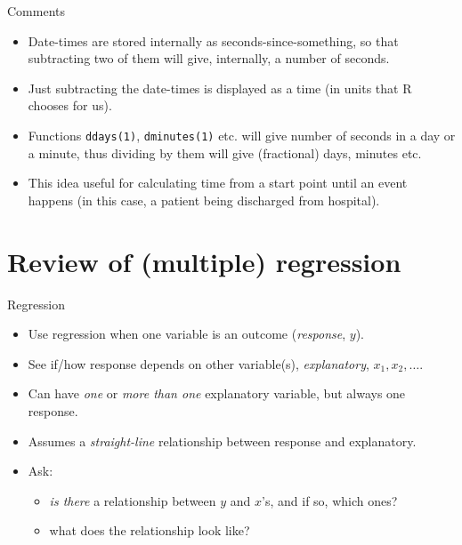 \documentclass[ignorenonframetext,]{beamer}
\providecommand{\tightlist}{%
  \setlength{\itemsep}{0pt}\setlength{\parskip}{0pt}}
\begin{document}
\begin{frame}[fragile]{Comments}
\protect\hypertarget{comments}{}

\begin{itemize}
\tightlist
\item
  Date-times are stored internally as seconds-since-something, so that
  subtracting two of them will give, internally, a number of seconds.
\item
  Just subtracting the date-times is displayed as a time (in units that
  R chooses for us).
\item
  Functions \texttt{ddays(1)}, \texttt{dminutes(1)} etc. will give
  number of seconds in a day or a minute, thus dividing by them will
  give (fractional) days, minutes etc.
\item
  This idea useful for calculating time from a start point until an
  event happens (in this case, a patient being discharged from
  hospital).
\end{itemize}

\end{frame}

\hypertarget{review-of-multiple-regression}{%
\section{Review of (multiple)
regression}\label{review-of-multiple-regression}}

\begin{frame}{Regression}
\protect\hypertarget{regression}{}

\begin{itemize}
\item
  Use regression when one variable is an outcome (\emph{response},
  \(y\)).
\item
  See if/how response depends on other variable(s), \emph{explanatory},
  \(x_1, x_2,\ldots\).
\item
  Can have \emph{one} or \emph{more than one} explanatory variable, but
  always one response.
\item
  Assumes a \emph{straight-line} relationship between response and
  explanatory.
\item
  Ask:

  \begin{itemize}
  \tightlist
  \item
    \emph{is there} a relationship between \(y\) and \(x\)'s, and if so,
    which ones?
  \item
    what does the relationship look like?
  \end{itemize}
\end{itemize}

\end{frame}
\end{document}
